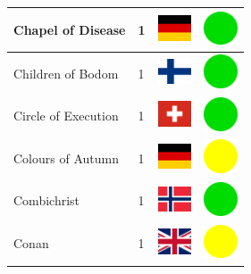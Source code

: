 \documentclass[12pt, a4paper, twoside]{report}
\begin{document}
\begin{center}
\begin{longtable}{|p{5cm}|p{2cm}|p{2cm}|p{2cm}|}
			Chapel of Disease & 1 & \includegraphics[width=1cm]{4x3/de} & \includegraphics[width=1cm]{likes/y} \\ \hline
			Children of Bodom & 1 & \includegraphics[width=1cm]{4x3/fi} & \includegraphics[width=1cm]{likes/y} \\ \hline
			Circle of Execution & 1 & \includegraphics[width=1cm]{4x3/ch} & \includegraphics[width=1cm]{likes/y} \\ \hline
			Colours of Autumn & 1 & \includegraphics[width=1cm]{4x3/de} & \includegraphics[width=1cm]{likes/m} \\ \hline
			Combichrist & 1 & \includegraphics[width=1cm]{4x3/no} & \includegraphics[width=1cm]{likes/y} \\ \hline
			Conan & 1 & \includegraphics[width=1cm]{4x3/gb} & \includegraphics[width=1cm]{likes/m} \\ \hline

\end{longtable}
\end{center}
\end{document}
